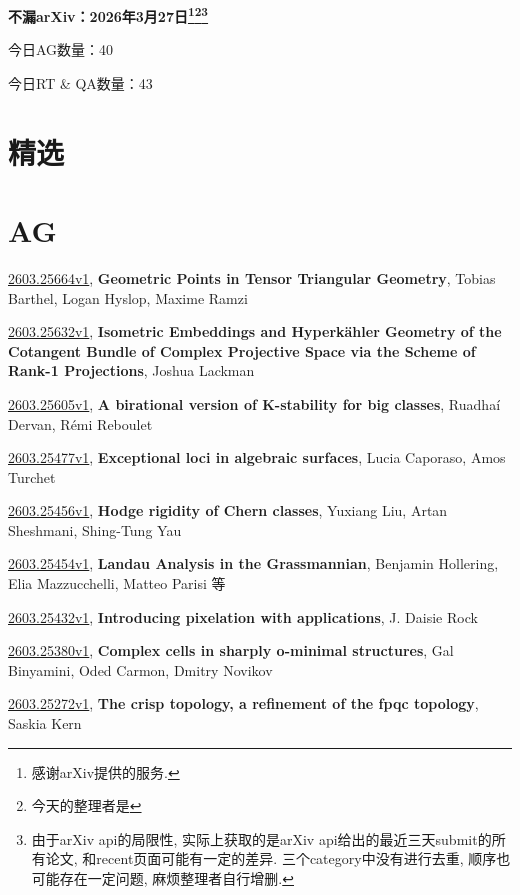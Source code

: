 \documentclass[9pt, a4paper]{article}
\theoremstyle{plain}
\theoremstyle{definition}
\theoremstyle{remark}
\newcommand{\arxiv}[3]{\href{https://arxiv.org/abs/#1}{#1}, \textbf{\textcolor{arxivblue}{#2}}, #3}
\newcommand{\AGnumber}{40}
\newcommand{\RTQAnumber}{43}
\newcommand{\NewestDate}{2026年3月27日}
\newcommand{\todayarXiver}{} %
\begin{document}
\begin{center}
    \Huge\textbf{不漏arXiv：\NewestDate\footnote{感谢arXiv提供的服务.}\footnote{今天的整理者是\todayarXiver}\footnote{由于arXiv api的局限性, 实际上获取的是arXiv api给出的最近三天submit的所有论文, 和recent页面可能有一定的差异. 三个category中没有进行去重, 顺序也可能存在一定问题, 麻烦整理者自行增删.}} \\
\end{center}

\setcounter{section}{-1}

\begin{center}
    今日AG数量：\AGnumber
    
    今日RT \& QA数量：\RTQAnumber
    
\end{center}


\section{精选}


\section{AG}
\arxiv{2603.25664v1}{Geometric Points in Tensor Triangular Geometry}{Tobias Barthel, Logan Hyslop, Maxime Ramzi}

\arxiv{2603.25632v1}{Isometric Embeddings and Hyperkähler Geometry of the Cotangent Bundle of Complex Projective Space via the Scheme of Rank-1 Projections}{Joshua Lackman}

\arxiv{2603.25605v1}{A birational version of K-stability for big classes}{Ruadhaí Dervan, Rémi Reboulet}

\arxiv{2603.25477v1}{Exceptional loci in algebraic surfaces}{Lucia Caporaso, Amos Turchet}

\arxiv{2603.25456v1}{Hodge rigidity of Chern classes}{Yuxiang Liu, Artan Sheshmani, Shing-Tung Yau}

\arxiv{2603.25454v1}{Landau Analysis in the Grassmannian}{Benjamin Hollering, Elia Mazzucchelli, Matteo Parisi 等}

\arxiv{2603.25432v1}{Introducing pixelation with applications}{J. Daisie Rock}

\arxiv{2603.25380v1}{Complex cells in sharply o-minimal structures}{Gal Binyamini, Oded Carmon, Dmitry Novikov}

\arxiv{2603.25272v1}{The crisp topology, a refinement of the fpqc topology}{Saskia Kern}
\end{document}
